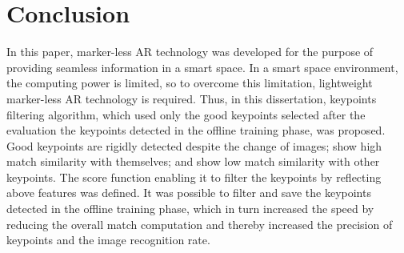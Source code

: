 
\section{Conclusion}


In this paper, marker-less AR technology was developed for the purpose of providing seamless information in a smart space. In a smart space environment, the computing power is limited, so to overcome this limitation, lightweight marker-less AR technology is required. Thus, in this dissertation, keypoints filtering algorithm, which used only the good keypoints selected after the evaluation the keypoints detected in the offline training phase, was proposed. Good keypoints are rigidly detected despite the change of images; show high match similarity with themselves; and show low match similarity with other keypoints. The score function enabling it to filter the keypoints by reflecting above features was defined. It was possible to filter and save the keypoints detected in the offline training phase, which in turn increased the speed by reducing the overall match computation and thereby increased the precision of keypoints and the image recognition rate.  
